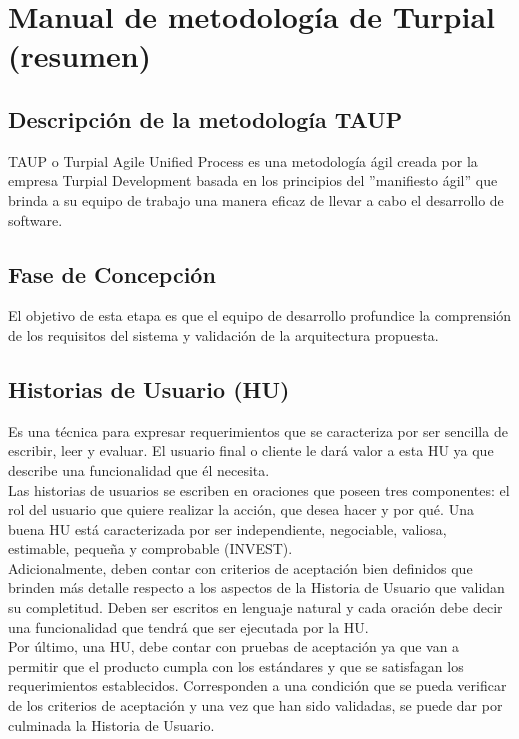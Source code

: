 \chapter{Manual de metodología de Turpial (resumen)}

\section{Descripción de la metodología TAUP}

TAUP o Turpial Agile Unified Process es una metodología ágil creada por la empresa Turpial Development basada en los principios del ”manifiesto ágil” que brinda a su equipo de trabajo una manera eficaz de llevar a cabo el desarrollo de software.

\section{Fase de Concepción}

El objetivo de esta etapa es que el equipo de desarrollo profundice la comprensión de los requisitos del sistema y validación de la arquitectura propuesta. 

\section{Historias de Usuario (HU)}

Es una técnica para expresar requerimientos que se caracteriza por ser sencilla de escribir, leer y evaluar. El usuario final o cliente le dará valor a esta HU ya que describe una funcionalidad que él necesita.\\

Las historias de usuarios se escriben en oraciones que poseen tres componentes: el rol del usuario que quiere realizar la acción, que desea hacer y por qué. Una buena HU está caracterizada por ser independiente, negociable, valiosa, estimable, pequeña y comprobable (INVEST).\\

Adicionalmente, deben contar con criterios de aceptación bien definidos que brinden más detalle respecto a los aspectos de la Historia de Usuario que validan su completitud. Deben ser escritos en lenguaje natural y cada oración debe decir una funcionalidad que tendrá que ser ejecutada por la HU.\\

Por último, una HU, debe contar con pruebas de aceptación ya que van a permitir que el producto cumpla con los estándares y que se satisfagan los requerimientos establecidos. Corresponden a una condición que se pueda verificar de los criterios de aceptación y una vez que han sido validadas, se puede dar por culminada la Historia de Usuario.

